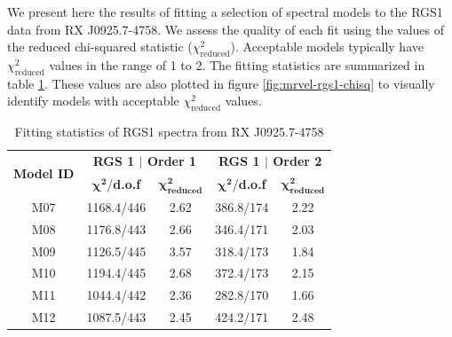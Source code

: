 			We present here the results of fitting a selection of spectral models to the RGS1 data from RX J0925.7-4758. We assess the quality of each fit using the values of the reduced chi-squared statistic ($\chi^2_\text{reduced}$). Acceptable models typically have $\chi^2_\text{reduced}$ values in the range of 1 to 2. The fitting statistics are summarized in table \ref{tab:fit-stat:rgs1}.  These values are also plotted in figure \ref{fig:mrvel-rgs1-chisq} to visually identify models with acceptable $\chi^2_\text{reduced}$ values.
			\begin{table}[!htb]
				\centering
				\caption{Fitting statistics of RGS1 spectra from RX J0925.7-4758}
				\label{tab:fit-stat:rgs1}
				\begin{tabular}{c|cc|cc}
					\hline
					\multirow{2}{*}{\textbf{Model ID}} & \multicolumn{2}{c|}{\textbf{RGS 1 $\vert$ Order 1}} & \multicolumn{2}{c}{\textbf{RGS 1 $\vert$ Order 2}} \\ \cline{2-5} & {$\boldsymbol{\chi^2}$/\textbf{d.o.f}} & {$\boldsymbol{\chi^2_\text{reduced}}$} & {$\boldsymbol{\chi^2}$/\textbf{d.o.f}} & {$\boldsymbol{\chi^2_\text{reduced}}$} \\ \hline
					{M07} & {1168.4/446} & {2.62} & {386.8/174} & {2.22} \\
					{M08} & {1176.8/443} & {2.66} & {346.4/171} & {2.03} \\
					{M09} & {1126.5/445} & {3.57} & {318.4/173} & {1.84} \\
					{M10} & {1194.4/445} & {2.68} & {372.4/173} & {2.15} \\
					{M11} & {1044.4/442} & {2.36} & {282.8/170} & {1.66} \\
					{M12} & {1087.5/443} & {2.45} & {424.2/171} & {2.48} \\ \hline
				\end{tabular}
			\end{table}
			
